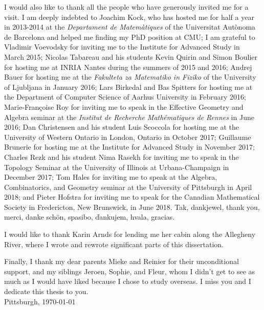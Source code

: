 I would also like to thank all the people who have generously invited me for a visit. I am deeply indebted to Joachim Kock, who has hosted me for half a year in 2013-2014 at the \textit{Departament de Matemàtiques} of the Universitat Autònoma de Barcelona and helped me finding my PhD position at CMU; I am grateful to Vladimir Voevodsky for inviting me to the Institute for Advanced Study in March 2015; Nicolas Tabareau and his students Kevin Quirin and Simon Boulier for hosting me at INRIA Nantes during the summers of 2015 and 2016; Andrej Bauer for hosting me at the \textit{Fakulteta za Matematiko in Fiziko} of the University of Ljubljana in January 2016; Lars Birkedal and Bas Spitters for hosting me at the Department of Computer Science of Aarhus University in February 2016; Marie-Françoise Roy for inviting me to speak in the Effective Geometry and Algebra seminar at the \textit{Institut de Recherche Mathématiques de Rennes} in June 2016; Dan Christensen and his student Luis Scoccola for hosting me at the University of Western Ontario in London, Ontario in October 2017; Guillaume Brunerie for hosting me at the Institute for Advanced Study in November 2017; Charles Rezk and his student Nima Rasekh for inviting me to speak in the Topology Seminar at the University of Illinois at Urbana-Champaign in December 2017; Tom Hales for inviting me to speak at the Algebra, Combinatorics, and Geometry seminar at the University of Pittsburgh in April 2018; and Pieter Hofstra for inviting me to speak for the Canadian Mathematical Society in Fredericton, New Brunswick, in June 2018. Tak, dankjewel, thank you, merci, danke sch\"on, spasibo, \v dankujem, hvala, gracias.

I would like to thank Karin Arnds for lending me her cabin along the Allegheny River, where I wrote and rewrote significant parts of this dissertation.

Finally, I thank my dear parents Mieke and Reinier for their unconditional support, and my siblings Jeroen, Sophie, and Fleur, whom I didn't get to see as much as I would have liked because I chose to study overseas. I miss you and I dedicate this thesis to you.\\[2em]

\noindent \hfill Pittsburgh, \today
